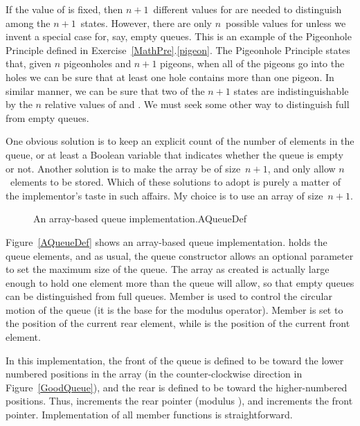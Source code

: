 If the value of  is fixed, then $n+1$~different
values for  are needed to distinguish among the $n+1$~states.
However, there are only $n$~possible values for  unless we
invent a special case for, say, empty queues.
This is an example of the
Pigeonhole Principle
defined in Exercise~\ref{MathPre}.\ref{pigeon}.
The Pigeonhole Principle states that, given \(n\) pigeonholes
and \(n+1\) pigeons, when all of the pigeons go into the holes we
can be sure that at least one hole contains more than one pigeon.
In similar manner, we can be sure that two of the $n+1$ states are
indistinguishable by the \(n\) relative values of  and
.
We must seek some other way to distinguish full from empty queues.

One obvious solution is to keep an explicit count of the number of
elements in the queue, or at least a Boolean variable that indicates
whether the queue is empty or not.
Another solution is to make the array be of size~$n+1$, and only allow
$n$~elements to be stored.
Which of these solutions to adopt is purely a matter of the
implementor's taste in such affairs.
My choice is to use an array of size~$n+1$.

\begin{figure}
\vspace{-\bigskipamount}

{An array-based queue implementation.}{AQueueDef}
\end{figure}

Figure~\ref{AQueueDef} shows an array-based queue implementation.
 holds the queue elements, and as usual, the
queue constructor allows an optional parameter to set the maximum size
of the queue.
The array as created is actually large enough to hold one element more
than the queue will allow, so that empty queues can be distinguished
from full queues.
Member  is used to control the circular motion of the
queue (it is the base for the modulus operator).
Member  is set to the position of the current rear element,
while  is the position of the current front element.

In this implementation, the front of the queue is defined to be toward
the lower numbered positions in the array (in the counter-clockwise
direction in Figure~\ref{GoodQueue}), and the rear is
defined to be toward the higher-numbered positions.
Thus,  increments the rear pointer (modulus ),
and  increments the front pointer.
Implementation of all member functions is straightforward.

